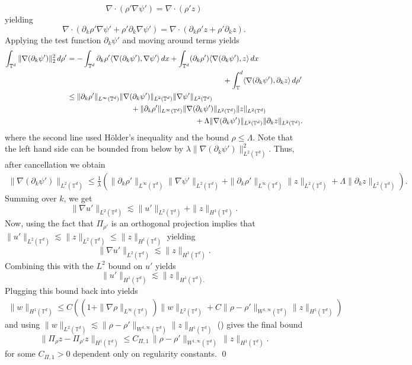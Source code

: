 \documentclass[11pt]{article}
\begin{document}
\[\nabla \cdot (\rho' \nabla \psi') = \nabla \cdot (\rho 'z)\]
yielding
\[\nabla \cdot (\partial_k\rho' \nabla \psi' + \rho'\partial_k\nabla \psi') = \nabla \cdot (\partial_k\rho' z + \rho'\partial_kz).\]
Applying the test function $\partial_k\psi'$ and moving around terms yields
\begin{align*}
    \int_{\mathbb{T}^d} \|\nabla (\partial_k\psi')\|_2^2
    \,d\rho' &= - \int_{\mathbb{T}^d} \partial_k\rho' \langle \nabla (\partial_k\psi'), \nabla \psi'\rangle \, dx+ \int_{\mathbb{T}^d} (\partial_k\rho')\langle \nabla (\partial_k\psi'), z\rangle \, dx\\
    &\hspace{73mm}+ \int_\mathbb{T}^d\langle \nabla (\partial_k\psi'), \partial_kz\rangle \, d\rho' \\
    &\leq \|\partial_k \rho'\|_{L^\infty(\mathbb{T}^d)}\|\nabla (\partial_k\psi')\|_{L^2(\mathbb{T}^d)}\|\nabla \psi'\|_{L^2(\mathbb{T}^d)}\\
    & \hspace{30mm} + \|\partial_k \rho'\|_{L^\infty(\mathbb{T}^d)}\|\nabla (\partial_k\psi')\|_{L^2(\mathbb{T}^d)}\|z\|_{L^2(\mathbb{T}^d)}\\
    &\hspace{60mm} + \Lambda\|\nabla(\partial_k \psi')\|_{L^2(\mathbb{T}^d)}\|\partial_kz\|_{L^2(\mathbb{T}^d)}.
\end{align*}
where the second line used H\"older's inequality and the bound $\rho \leq \Lambda$. Note that the left hand side can be bounded from below by $\lambda \|\nabla (\partial_k\psi')\|_{L^2(\mathbb{T}^d)}^2$. Thus, after cancellation we obtain
\begin{align*}
    \|\nabla (\partial_k\psi')\|_{L^2(\mathbb{T}^d)} \leq \frac{1}{\lambda}\left(\|\partial_k \rho'\|_{L^\infty(\mathbb{T}^d)}\|\nabla \psi'\|_{L^2(\mathbb{T}^d)} + \|\partial_k \rho'\|_{L^\infty(\mathbb{T}^d)}\|z\|_{L^2(\mathbb{T}^d)} + \Lambda\|\partial_kz\|_{L^2(\mathbb{T}^d)} \right).
\end{align*}
Summing over $k$, we get
\[\|\nabla u'\|_{L^2(\mathbb{T}^d)} \lesssim \|u'\|_{L^2(\mathbb{T}^d)} + \|z\|_{H^1(\mathbb{T}^d)}.\]
Now, using the fact that $\Pi_{\rho'}$ is an orthogonal projection implies that $\|u'\|_{L^2(\mathbb{T}^d)} \lesssim \|z\|_{L^2(\mathbb{T}^d)} \leq \|z\|_{H^1(\mathbb{T}^d)}$ yielding 
\[\|\nabla u'\|_{L^2(\mathbb{T}^d)} \lesssim \|z\|_{H^1(\mathbb{T}^d)}.\]
Combining this with the $L^2$ bound on $u'$ yields
\[\|u'\|_{H^1(\mathbb{T}^d)} \lesssim  \|z\|_{H^1(\mathbb{T}^d).}\]
Plugging this bound back into  yields
\begin{align*}
    \|w\|_{H^1(\mathbb{T}^d)} \leq C\left((1+\|\nabla \rho\|_{L^\infty(\mathbb{T}^d)})\|w\|_{L^2(\mathbb{T}^d)} + C\|\rho - \rho'\|_{W^{1, \infty}(\mathbb{T}^d)}\|z\|_{H^1(\mathbb{T}^d)}\right)
\end{align*}
and using $\|w\|_{L^2(\mathbb{T}^d)} \lesssim \|\rho - \rho'\|_{W^{1, \infty}(\mathbb{T}^d)}\|z\|_{H^1(\mathbb{T}^d)}$ () gives the final bound
\[\|\Pi_\rho z-\Pi_{\rho'} z\|_{H^1(\mathbb{T}^d)}
\le
C_{\Pi, 1}\,\|\rho-\rho'\|_{W^{1,\infty}(\mathbb{T}^d)}\,\|z\|_{H^1(\mathbb{T}^d)}.\]
for some $C_{\Pi, 1} > 0$ dependent only on regularity constants. \qed{}
\end{document}
